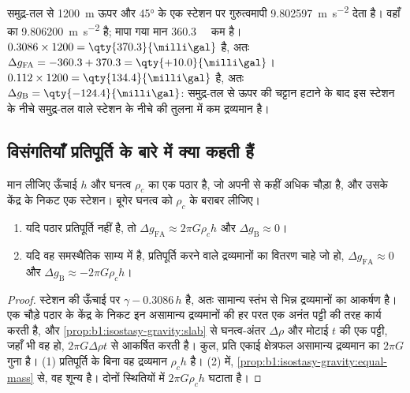 \begin{example}[एक पहाड़ी पर स्टेशन]\label{ex:b1:isostasy-gravity:reduction}
समुद्र-तल से \qty{1200}{m} ऊपर और \ang{45}  के एक स्टेशन पर गुरुत्वमापी \qty{9.802597}{m.s^{-2}} देता है। वहाँ का  \qty{9.806200}{m.s^{-2}} है; मापा गया मान \qty{360.3}{\milli\gal} कम है।  $0.3086\times1200 = \qty{370.3}{\milli\gal}$ है, अतः $\Delta g_{\mathrm{FA}} = -360.3 + 370.3 = \qty{+10.0}{\milli\gal}$।  $0.112\times1200 = \qty{134.4}{\milli\gal}$ है, अतः $\Delta g_{\mathrm B}
= \qty{-124.4}{\milli\gal}$: समुद्र-तल से ऊपर की चट्टान हटाने के बाद इस स्टेशन के नीचे समुद्र-तल वाले स्टेशन के नीचे की तुलना में कम द्रव्यमान है।
\end{example}

\subsection*{विसंगतियाँ प्रतिपूर्ति के बारे में क्या कहती हैं}

\begin{proposition}[व्यापक उच्चावच पर विसंगतियाँ]\label{prop:b1:isostasy-gravity:broad}
मान लीजिए ऊँचाई $h$ और घनत्व $\rho_c$ का एक पठार है, जो अपनी  से कहीं अधिक चौड़ा है, और उसके केंद्र के निकट एक स्टेशन। बूगेर घनत्व को $\rho_c$ के बराबर लीजिए।
\begin{enumerate}
  \item यदि पठार प्रतिपूर्ति नहीं है, तो $\Delta g_{\mathrm{FA}} \approx
        2\pi G\rho_c h$ और $\Delta g_{\mathrm B} \approx 0$।
  \item यदि वह समस्थैतिक साम्य में है, प्रतिपूर्ति करने वाले द्रव्यमानों का वितरण चाहे जो हो, $\Delta g_{\mathrm{FA}} \approx 0$ और
        $\Delta g_{\mathrm B} \approx -2\pi G\rho_c h$।
\end{enumerate}
\end{proposition}

\begin{proof}
स्टेशन की ऊँचाई पर  $\gamma - 0.3086\,h$ है, अतः  सामान्य स्तंभ से भिन्न द्रव्यमानों का आकर्षण है। एक चौड़े पठार के केंद्र के निकट इन असामान्य द्रव्यमानों की हर परत एक अनंत पट्टी की तरह कार्य करती है, और \cref{prop:b1:isostasy-gravity:slab} से घनत्व-अंतर $\Delta\rho$ और मोटाई $t$ की एक पट्टी, जहाँ भी वह हो, $2\pi G\Delta\rho
t$ से आकर्षित करती है। कुल, प्रति एकाई क्षेत्रफल असामान्य द्रव्यमान का $2\pi G$ गुना है। (1) प्रतिपूर्ति के बिना वह द्रव्यमान $\rho_c h$ है। (2)  में, \cref{prop:b1:isostasy-gravity:equal-mass} से, वह शून्य है। दोनों स्थितियों में  $2\pi G\rho_c h$ घटाता है।
\end{proof}

